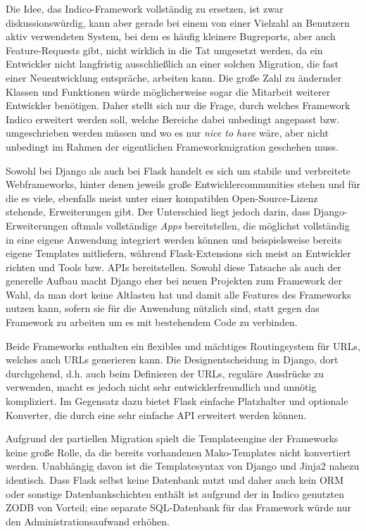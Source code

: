Die Idee, das Indico-Framework vollständig zu ersetzen, ist zwar diskussionswürdig, kann aber gerade
bei einem von einer Vielzahl an Benutzern aktiv verwendeten System, bei dem es häufig kleinere
Bugreports, aber auch Feature-Requests gibt, nicht wirklich in die Tat umgesetzt werden, da ein
Entwickler nicht langfristig ausschließlich an einer solchen Migration, die fast einer
Neuentwicklung entspräche, arbeiten kann. Die große Zahl zu ändernder Klassen und Funktionen würde
möglicherweise sogar die Mitarbeit weiterer Entwickler benötigen. Daher stellt sich nur die Frage,
durch welches Framework Indico erweitert werden soll, welche Bereiche dabei unbedingt angepasst bzw.
umgeschrieben werden müssen und wo es nur \emph{nice to have} wäre, aber nicht unbedingt im Rahmen
der eigentlichen Frameworkmigration geschehen muss.

Sowohl bei Django als auch bei Flask handelt es sich um stabile und verbreitete Webframeworks,
hinter denen jeweils große Entwicklercommunities stehen und für die es viele, ebenfalls meist unter
einer kompatiblen Open-Source-Lizenz stehende, Erweiterungen gibt. Der Unterschied liegt jedoch
darin, dass Django-Erweiterungen oftmals vollständige \emph{Apps} bereitstellen, die möglichst
vollständig in eine eigene Anwendung integriert werden können und beispielsweise bereits eigene
Templates mitliefern, während Flask-Extensions sich meist an Entwickler richten und Tools bzw. APIs
bereitstellen. Sowohl diese Tatsache als auch der generelle Aufbau macht Django eher bei neuen
Projekten zum Framework der Wahl, da man dort keine Altlasten hat und damit alle Features des
Frameworks nutzen kann, sofern sie für die Anwendung nützlich sind, statt gegen das Framework zu
arbeiten um es mit bestehendem Code zu verbinden.

Beide Frameworks enthalten ein flexibles und mächtiges Routingsystem für URLs, welches auch URLs
generieren kann. Die Designentscheidung in Django, dort durchgehend, d.h. auch beim Definieren der
URLs, reguläre Ausdrücke zu verwenden, macht es jedoch nicht sehr entwicklerfreundlich und unnötig
kompliziert. Im Gegensatz dazu bietet Flask einfache Platzhalter und optionale Konverter, die durch
eine sehr einfache API erweitert werden können.

Aufgrund der partiellen Migration spielt die Templateengine der Frameworks keine große Rolle, da
die bereits vorhandenen Mako-Templates nicht konvertiert werden. Unabhängig davon ist die
Templatesyntax von Django und Jinja2 nahezu identisch. Dass Flask selbst keine Datenbank nutzt und
daher auch kein ORM oder sonstige Datenbankschichten enthält ist aufgrund der in Indico genutzten
ZODB von Vorteil; eine separate SQL-Datenbank für das Framework würde nur den Administrationsaufwand
erhöhen.

